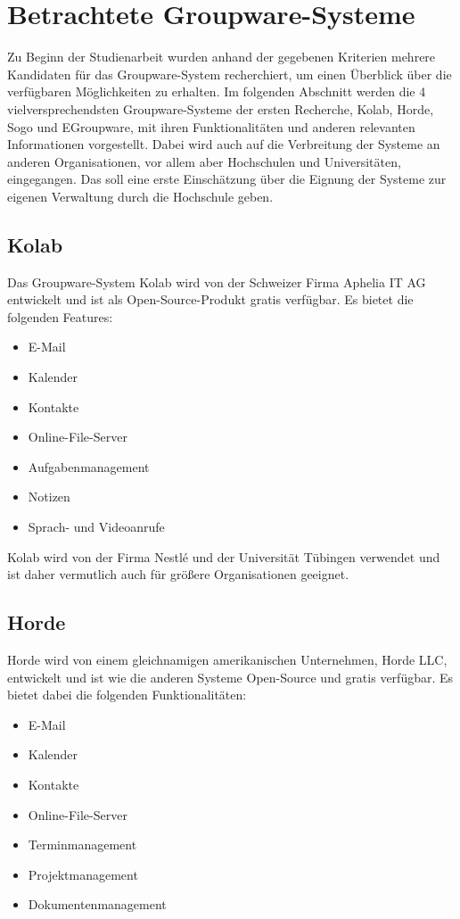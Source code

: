 \newpage

\section{Betrachtete Groupware-Systeme}

Zu Beginn der Studienarbeit wurden anhand der gegebenen Kriterien mehrere Kandidaten für das Groupware-System recherchiert, um einen Überblick über die verfügbaren Möglichkeiten zu erhalten.
Im folgenden Abschnitt werden die 4 vielversprechendsten Groupware-Systeme der ersten Recherche, Kolab, Horde, Sogo und EGroupware, mit ihren Funktionalitäten und anderen relevanten Informationen vorgestellt.
Dabei wird auch auf die Verbreitung der Systeme an anderen Organisationen, vor allem aber Hochschulen und Universitäten, eingegangen.
Das soll eine erste Einschätzung über die Eignung der Systeme zur eigenen Verwaltung durch die Hochschule geben.


\subsection{Kolab}

Das Groupware-System Kolab wird von der Schweizer Firma Aphelia IT AG entwickelt und ist als Open-Source-Produkt gratis verfügbar. Es bietet die folgenden Features:
\begin{itemize}
    \item E-Mail
    \item Kalender
    \item Kontakte
    \item Online-File-Server
    \item Aufgabenmanagement
    \item Notizen
    \item Sprach- und Videoanrufe
\end{itemize}
\autocite[][]{kolab}

Kolab wird von der Firma Nestlé und der Universität Tübingen verwendet und ist daher vermutlich auch für größere Organisationen geeignet.

\subsection{Horde}

Horde wird von einem gleichnamigen amerikanischen Unternehmen, Horde LLC, entwickelt und ist wie die anderen Systeme Open-Source und gratis verfügbar. Es bietet dabei die folgenden Funktionalitäten:
\begin{itemize}
    \item E-Mail
    \item Kalender
    \item Kontakte
    \item Online-File-Server
    \item Terminmanagement
    \item Projektmanagement
    \item Dokumentenmanagement
    
\end{itemize}
\autocite[][]{horde}

